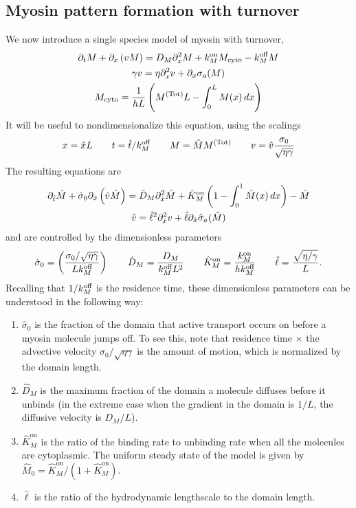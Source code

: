 \documentclass[11pt]{article}
\newcommand{\6}[1]{#1_{\text{6}}}
\newcommand{\3}[1]{#1_{\text{3}}}
\newcommand{\Tot}[1]{#1^\text{(Tot)}}
\newcommand{\My}[1]{#1_M}
\begin{document}
\subsection{Myosin pattern formation with turnover}
We now introduce a single species model of myosin with turnover, 
\begin{subequations}
\begin{gather}
\Dt M + \Dx \left(v M\right) = D_M \Dx^2 M +\My{\kon}M_\text{cyto} - \My{\koff} M \\
\label{eq:veleqndim}
\gamma v = \eta \Dx^2 v + \Dx \sigma_a(M)\\
M_\text{cyto} = \frac{1}{hL}\left(\Tot{M}L-\int_0^L M(x) \, dx\right)
\end{gather}
\end{subequations}
It will be useful to nondimensionalize this equation, using the scalings
\begin{equation}
\label{eq:NDD}
x = \hat{x} L \qquad t= \hat{t}/\My{\koff} \qquad M= \hat{M}\Tot{M} \qquad v = \hat{v} \frac{\sigma_0}{\sqrt{\eta \gamma}}
\end{equation}
The resulting equations are 
\begin{subequations}
\begin{gather}
\label{eq:MND}
\partial_{\hat{t}} \hat{M} +\hat{\sigma}_0  \partial_{\hat{x}} \left(\hat{v} \hat{M} \right) =\hat{D}_M \partial_{\hat{x}}^2 \hat{M} +\hat{K}^\text{on}_M \left(1-\int_0^1  \hat{M}(x) \, dx\right) - \hat{M}\\
\label{eq:MVND}
\hat{v} = \hat{\ell}^2 \partial_{\hat{x}}^2 v +\hat{\ell} \partial_{\hat{x}} \hat{\sigma}_a(\hat{M})
 \end{gather}
\end{subequations}
and are controlled by the dimensionless parameters
\begin{equation}
\label{eq:NDparams}
\hat{\sigma}_0 = \left(\frac{\sigma_0/ \sqrt{\eta \gamma} }{L \My{\koff}}\right)   \qquad \hat{D}_M =\frac{D_M}{\My{\koff}  L^2} \qquad \hat{K}^\text{on}_M= \frac{\My{\kon}}{h \My{\koff}} \qquad \hat{\ell} = \frac{\sqrt{\eta/\gamma}}{L}.
\end{equation}
Recalling that $1/\My{\koff}$ is the residence time, these dimensionless parameters can be understood in the following way: 
\begin{enumerate}
\item $\hat{\sigma}_0$ is the fraction of the domain that active transport occurs on before a myosin molecule jumps off. To see this, note that residence time $\times$ the advective velocity $\sigma_0 / \sqrt{\eta \gamma}$ is the amount of motion, which is normalized by the domain length.
\item $\hat{D}_M$ is the maximum fraction of the domain a molecule diffuses before it unbinds (in the extreme case when the gradient in the domain is $1/L$, the diffusive velocity is $D_M/L$). 
\item $\hat{K}^\text{on}_M$ is the ratio of the binding rate to unbinding rate when all the molecules are cytoplasmic. The uniform steady state of the model is given by $\hat{M}_0= \hat{K}^\text{on}_M/\left(1+\hat{K}^\text{on}_M\right)$.
\item $\hat{\ell}$ is the ratio of the hydrodynamic lengthscale to the domain length.
\end{enumerate}
\end{document}
